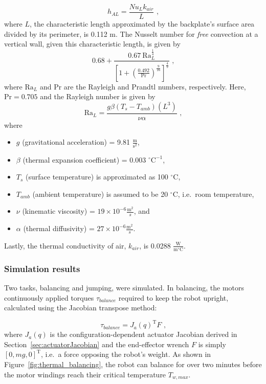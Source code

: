 \documentclass{report}
\begin{document}
\begin{equation}
h_{AL} = \frac{Nu_{L}k_{air}}{L}\text{ ,}
\end{equation}
where $L$, the characteristic length approximated by the backplate's surface area divided by its perimeter, is 0.112 m. The Nusselt number for \textit{free} convection at a vertical wall, given this characteristic length, is given by 
\begin{equation}
0.68 + \frac{0.67\ \text{Ra}_{L}^{\frac{1}{4}}}{\left[1 + \left(\frac{0.492}{\text{Pr}}\right)^{\frac{9}{16}}\right]^{\frac{4}{9}}}\text{ ,}
\end{equation}
where $\text{Ra}_{L}$ and $\text{Pr}$ are the Rayleigh and Prandtl numbers, respectively. Here, $\text{Pr} = 0.705$ and the Rayleigh number is given by
\begin{equation}
\text{Ra}_{L} = \frac{g\beta\left(T_{s} - T_{amb}\right)\left(L^{3}\right)}{\nu\alpha}\text{ ,}
\end{equation}
where
\begin{itemize}
\item $g$ (gravitational acceleration) = 9.81 $\frac{\text{m}}{\text{s}^2}$,
\item $\beta$ (thermal expansion coefficient) = 0.003 $^\circ\text{C}^{-1}$,
\item $T_{s}$ (surface temperature) is approximated as 100 $^\circ\text{C}$,
\item $T_{amb}$ (ambient temperature) is assumed to be 20 $^\circ\text{C}$, i.e.\ room temperature,
\item $\nu$ (kinematic viscosity) = $19\times10^{-6} \frac{\text{m}^2}{s}$, and
\item $\alpha$ (thermal diffusivity) = $27\times10^{-6} \frac{\text{m}^2}{s}$.
\end{itemize}
Lastly, the thermal conductivity of air, $k_{air}$, is 0.0288 $\frac{\text{W}}{\text{m}^\circ\text{C}}$.

\subsubsection[Simulation results]{Simulation results}
Two tasks, balancing and jumping, were simulated. In balancing, the motors continuously applied torques $\tau_{balance}$ required to keep the robot upright, calculated using the Jacobian transpose method:

\begin{equation}
\tau_{balance} = J_{a}(q)^{\text{T}}F\text{ ,}
\end{equation}
where $J_{a}(q)$ is the configuration-dependent actuator Jacobian derived in Section~\ref{sec:actuatorJacobian} and the end-effector wrench $F$ is simply $\left[0, mg, 0\right]^{\text{T}}$, i.e.\ a force opposing the robot's weight. As shown in Figure~\ref{fig:thermal_balancing}, the robot can balance for over two minutes before the motor windings reach their critical temperature $T_{w,max}$.
\end{document}
